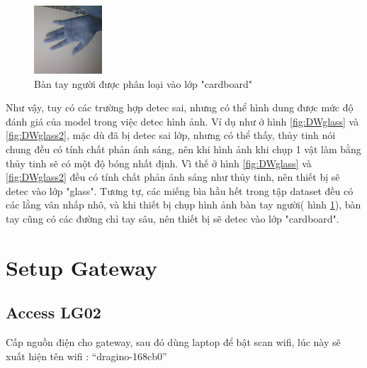 \begin{figure}[H]
    \centering
    \includegraphics[width=\linewidth]{images/Quanh/cardboard_W.bmp}
    \caption{ Bàn tay người được phân loại vào lớp "cardboard" }
    \label{fig:DWcardboar}
\end{figure}

Như vậy, tuy có các trường hợp detec sai, nhưng có thể hình dung được mức độ đánh giá của model trong việc detec hình ảnh. Ví dụ như ở hình \ref{fig:DWglass} và \ref{fig:DWglass2}, mặc dù đã bị detec sai lớp, nhưng có thể thấy, thủy tinh nói chung đều có tính chất phản ánh sáng, nên khi hình ảnh khi chụp 1 vật làm bằng thủy tinh sẽ có một độ bóng nhất định. Vì thế ở hình \ref{fig:DWglass} và \ref{fig:DWglass2} đều có tính chất phản ánh sáng như thủy tinh, nên thiết bị sẽ detec vào lớp "glass". Tương tự, các miếng bìa hầu hết trong tập dataset đều có các lằng vân nhấp nhô, và khi thiết bị chụp hình ảnh bàn tay người( hình \ref{fig:DWcardboar}), bàn tay cũng có các đường chỉ tay sâu, nên thiết bị sẽ detec vào lớp "cardboard".


\section{Setup Gateway}
\subsection{Access LG02}
Cấp nguồn điện cho gateway, sau đó dùng laptop để bật scan wifi, lúc này sẽ xuất hiện tên wifi : “dragino-168cb0”

